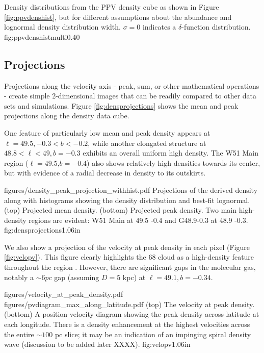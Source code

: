 {Density distributions from the PPV density cube as shown in Figure
\ref{fig:ppvdenshist}, but for different assumptions about the \formaldehyde
abundance and lognormal density distribution width.  $\sigma=0$ indicates a
$\delta$-function distribution.}
{fig:ppvdenshistmulti}{0.4}{0}


\subsection{Projections}
Projections along the velocity axis - peak, sum, or other mathematical
operations - create simple 2-dimensional images that can be readily compared to
other data sets and simulations.  Figure \ref{fig:densprojections} shows the
mean and peak projections along the density data cube.  

One feature of particularly low mean and peak density appears at $\ell=49.5,
-0.3<b<-0.2$, while another elongated structure at $48.8<\ell<49, b=-0.3$
exhibits an overall uniform high density.  The W51 Main region
($\ell=49.5$,$b=-0.4$) also shows relatively high densities towards its center,
but with evidence of a radial decrease in density to its outskirts.


            {figures/density_peak_projection_withhist.pdf}
{Projections of the derived density along with histograms
showing the density distribution and best-fit lognormal.
(top) Projected mean density.
(bottom) Projected peak density.
Two main high-density regions are evident: W51 Main at 49.5 -0.4 and G48.9-0.3 at 48.9 -0.3.}
{fig:densprojections}{1.0}{6in}

We also show a projection of the velocity at peak density in each pixel (Figure
\ref{fig:velopv}).  This figure clearly highlights the 68 \kms cloud as a
high-density feature throughout the region \citep{Carpenter1998a}.  However,
there are significant gaps in the molecular gas, notably a $\sim6 pc$ gap
(assuming $D=5$ kpc) at $\ell=49.1, b=-0.34$.

\FigureTwoAA
{figures/velocity_at_peak_density.pdf}
{figures/pvdiagram_max_along_latitude.pdf}
{(top) The velocity at peak density.
 (bottom) A position-velocity diagram showing the peak density across latitude
 at each longitude.  There is a density enhancement at the highest velocities
 across the entire $\sim100$ pc slice; it may be an indication of an impinging 
 spiral density wave (discussion to be added later XXXX).
}
{fig:velopv}{1.0}{6in}

